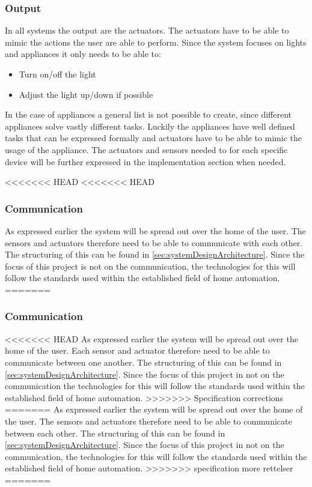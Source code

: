 \subsubsection{Output}
In all systems the output are the actuators. The actuators have to be able to mimic the actions the user are able to perform. Since the system focuses on lights and appliances it only needs to be able to:
\begin{itemize}
	\item Turn on/off the light
	\item Adjust the light up/down if possible
\end{itemize}
In the case of appliances a general list is not possible to create, since different appliances solve vastly different tasks. Luckily the appliances have well defined tasks that can be expressed formally and actuators have to be able to mimic the usage of the appliance. The actuators and sensors needed to for each specific device will be further expressed in the implementation section when needed.

<<<<<<< HEAD
<<<<<<< HEAD
\subsubsection{Communication}
As expressed earlier the system will be spread out over the home of the user. The sensors and actuators therefore need to be able to communicate with each other. The structuring of this can be found in \cref{sec:systemDesignArchitecture}. Since the focus of this project is not on the communication, the technologies for this will follow the standards used within the established field of home automation.
=======
\subsubsection{Communication}
<<<<<<< HEAD
As expressed earlier the system will be spread out over the home of the user. Each sensor and actuator therefore need to be able to communicate between one another. The structuring of this can be found in \cref{sec:systemDesignArchitecture}. Since the focus of this project in not on the communication the technologies for this will follow the standards used within the established field of home automation.
>>>>>>> Specification corrections
=======
As expressed earlier the system will be spread out over the home of the user. The sensors and actuators therefore need to be able to communicate between each other. The structuring of this can be found in \cref{sec:systemDesignArchitecture}. Since the focus of this project in not on the communication, the technologies for this will follow the standards used within the established field of home automation.
>>>>>>> specification more rettelser
=======
